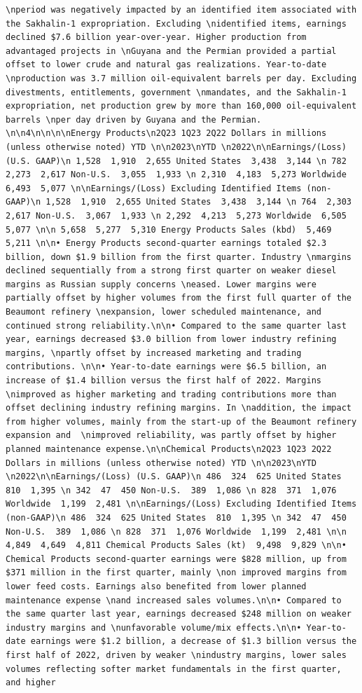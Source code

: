 \documentclass[
  letterpaper,
  DIV=11,
  numbers=noendperiod]{scrreprt}
\begin{document}
\begin{verbatim}
\nperiod was negatively impacted by an identified item associated with the Sakhalin-1 expropriation. Excluding \nidentified items, earnings declined $7.6 billion year-over-year. Higher production from advantaged projects in \nGuyana and the Permian provided a partial offset to lower crude and natural gas realizations. Year-to-date \nproduction was 3.7 million oil-equivalent barrels per day. Excluding divestments, entitlements, government \nmandates, and the Sakhalin-1 expropriation, net production grew by more than 160,000 oil-equivalent barrels \nper day driven by Guyana and the Permian.   \n\n4\n\n\n\nEnergy Products\n2Q23 1Q23 2Q22 Dollars in millions (unless otherwise noted) YTD \n\n2023\nYTD \n2022\n\nEarnings/(Loss) (U.S. GAAP)\n 1,528  1,910  2,655 United States  3,438  3,144 \n 782  2,273  2,617 Non-U.S.  3,055  1,933 \n 2,310  4,183  5,273 Worldwide  6,493  5,077 \n\nEarnings/(Loss) Excluding Identified Items (non-GAAP)\n 1,528  1,910  2,655 United States  3,438  3,144 \n 764  2,303  2,617 Non-U.S.  3,067  1,933 \n 2,292  4,213  5,273 Worldwide  6,505  5,077 \n\n 5,658  5,277  5,310 Energy Products Sales (kbd)  5,469  5,211 \n\n• Energy Products second-quarter earnings totaled $2.3 billion, down $1.9 billion from the first quarter. Industry \nmargins declined sequentially from a strong first quarter on weaker diesel margins as Russian supply concerns \neased. Lower margins were partially offset by higher volumes from the first full quarter of the Beaumont refinery \nexpansion, lower scheduled maintenance, and continued strong reliability.\n\n• Compared to the same quarter last year, earnings decreased $3.0 billion from lower industry refining margins, \npartly offset by increased marketing and trading contributions. \n\n• Year-to-date earnings were $6.5 billion, an increase of $1.4 billion versus the first half of 2022. Margins \nimproved as higher marketing and trading contributions more than offset declining industry refining margins. In \naddition, the impact from higher volumes, mainly from the start-up of the Beaumont refinery expansion and  \nimproved reliability, was partly offset by higher planned maintenance expense.\n\nChemical Products\n2Q23 1Q23 2Q22 Dollars in millions (unless otherwise noted) YTD \n\n2023\nYTD \n2022\n\nEarnings/(Loss) (U.S. GAAP)\n 486  324  625 United States  810  1,395 \n 342  47  450 Non-U.S.  389  1,086 \n 828  371  1,076 Worldwide  1,199  2,481 \n\nEarnings/(Loss) Excluding Identified Items (non-GAAP)\n 486  324  625 United States  810  1,395 \n 342  47  450 Non-U.S.  389  1,086 \n 828  371  1,076 Worldwide  1,199  2,481 \n\n 4,849  4,649  4,811 Chemical Products Sales (kt)  9,498  9,829 \n\n• Chemical Products second-quarter earnings were $828 million, up from $371 million in the first quarter, mainly \non improved margins from lower feed costs. Earnings also benefited from lower planned maintenance expense \nand increased sales volumes.\n\n• Compared to the same quarter last year, earnings decreased $248 million on weaker industry margins and \nunfavorable volume/mix effects.\n\n• Year-to-date earnings were $1.2 billion, a decrease of $1.3 billion versus the first half of 2022, driven by weaker \nindustry margins, lower sales volumes reflecting softer market fundamentals in the first quarter, and higher 
\end{verbatim}
\end{document}

